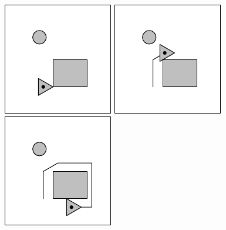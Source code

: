 \begin{figure}
\begin{center}
\includegraphics[]{planning/figs/pg_0001.pdf} \hspace{1em}
\includegraphics[]{planning/figs/pg_0003.pdf}\hspace{1em}
\includegraphics[]{planning/figs/pg_0008.pdf}

\vspace{1em}


\end{center}
\end{figure}
